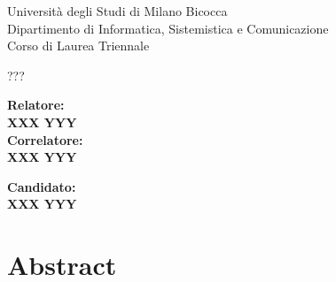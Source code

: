 \documentclass[12pt]{report}
\begin{document}
	\begin{titlepage}
		\begin{center}
			{\LARGE{Università degli Studi di Milano Bicocca \\}}
			{\small{Dipartimento di Informatica, Sistemistica e Comunicazione}}\\
			{\small{Corso di Laurea Triennale}}
		\end{center}
			
		\begin{figure}[H]
			\centering
		\end{figure}

		\begin{center}
			{\Large { ??? }}
		\end{center}

		\vspace{2cm}

		\begin{minipage}[t]{0.47\textwidth}
			{\large{\bf Relatore:\\ XXX YYY}}
			\vspace{0.5cm}
			{\large{\bf \\Correlatore:\\ XXX YYY}}
		\end{minipage}\hfill\begin{minipage}[t]{0.47\textwidth}\raggedleft
			{\large{\bf Candidato: \\XXX YYY\\ }}
		\end{minipage}

		\vspace{25mm}

	\end{titlepage}

	\tableofcontents
	\thispagestyle{empty}

	\listoffigures
	\thispagestyle{empty}
	\clearpage

	\setcounter{page}{1}





	\chapter{Abstract}
\end{document}
